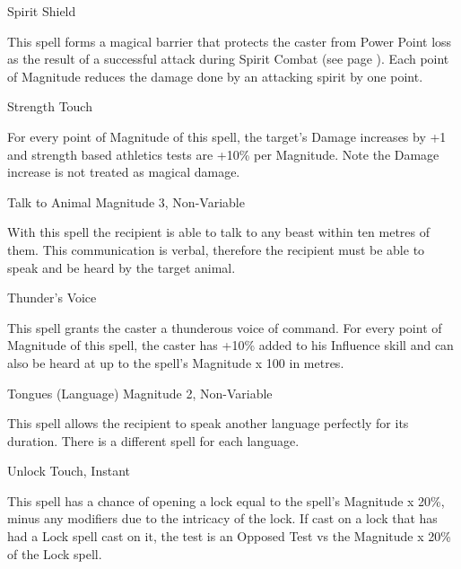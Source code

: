 \begin{rpg-spell}
{Spirit Shield}
{}

This spell forms a magical barrier that protects the caster from Power Point loss as the result of a successful attack during Spirit Combat (see page \pageref{ssec:spirit-combat}). Each point of Magnitude reduces the damage done by an attacking spirit by one point.
\end{rpg-spell}


\begin{rpg-spell}
{Strength}
{Touch}

For every point of Magnitude of this spell, the target’s Damage increases by +1 and strength based athletics tests are +10\% per Magnitude. Note the Damage increase is not treated as magical damage.
\end{rpg-spell}


\begin{rpg-spell}
{Talk to Animal}
{Magnitude 3, Non-Variable}

With this spell the recipient is able to talk to any beast within ten metres of them. This communication is verbal, therefore the recipient must be able to speak and be heard by the target animal. 
\end{rpg-spell}


\begin{rpg-spell}
{Thunder's Voice}
{}

This spell grants the caster a thunderous voice of command. For every point of Magnitude of this spell, the caster has +10\% added to his Influence skill and can also be heard at up to the spell’s Magnitude x 100 in metres.
\end{rpg-spell}


\begin{rpg-spell}
{Tongues (Language)}
{Magnitude 2, Non-Variable}

This spell allows the recipient to speak another language perfectly for its duration. There is a different spell for each language.
\end{rpg-spell}


\begin{rpg-spell}
{Unlock}
{Touch, Instant}

This spell has a chance of opening a lock equal to the spell’s Magnitude x 20\%, minus any modifiers due to the intricacy of the lock. If cast on a lock that has had a Lock spell cast on it, the test is an Opposed Test vs the Magnitude x 20\% of the Lock spell.
\end{rpg-spell}


